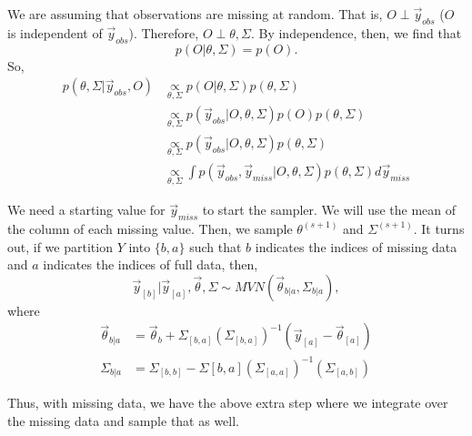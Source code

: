 \documentclass[titlepage, 12pt, leqno]{article}
\begin{document}
We are assuming that observations are missing at random. That is, $O\perp 
\vec y_{obs}$ ($O$ is independent of $\vec y_{obs}$). Therefore,
$O\perp \theta,\Sigma$. By independence, then, we find that
\[
p(O|\theta, \Sigma) = p(O).
\]
So,
\begin{align*}
    p(\theta,\Sigma|\vec y_{obs}, O) &\underset{\theta,\Sigma}{\propto}
    p(O|\theta,\Sigma)p(\theta,\Sigma) \\
                                     &\underset{\theta,\Sigma}{\propto}
                                     p(\vec y_{obs}|O,\theta,\Sigma)p(O)
                                     p(\theta,\Sigma)\\
                                     &\underset{\theta,\Sigma}{\propto}
                                     p(\vec y_{obs}|O, \theta, \Sigma)
                                     p(\theta, \Sigma)\\
                                     &\underset{\theta,\Sigma}{\propto}
                                     \int p(\vec y_{obs}, \vec y_{miss}|
                                     O, \theta, \Sigma)p(\theta,\Sigma)
                                     d \vec y_{miss}
\end{align*}

We need a starting value for $\vec y_{miss}$ to start the sampler. We will use
the mean of the column of each missing value. Then, we sample $\theta^{(s+1)}$
and $\Sigma^{(s+1)}$. It turns out, if we partition $Y$ into $\{b,a\}$ such that
$b$ indicates the indices of missing data and $a$ indicates the indices of full
data, then,
\[
    \vec y_{[b]}|\vec y_{[a]}, \vec \theta, \Sigma \sim MVN(\vec \theta_{b|a},
    \Sigma_{b|a}),
\]
where
\begin{align*}
    \vec \theta_{b|a} &= \vec \theta_{b} + \Sigma_{[b,a]}\left(\Sigma_{[b,a]}
    \right)^{-1}\left(\vec y_{[a]}-\vec \theta_{[a]}\right)\\
        \Sigma_{b|a} &= \Sigma_{[b,b]} - \Sigma[b,a]\left(\Sigma_{[a,a]}
            \right)^{-1}\left(\Sigma_{[a,b]}\right)
\end{align*}

Thus, with missing data, we have the above extra step where we integrate over 
the missing data and sample that as well.
\end{document}
